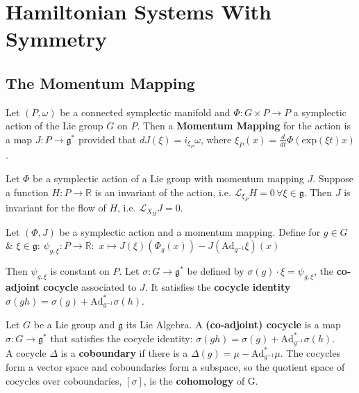 

\section{Hamiltonian Systems With Symmetry}

\subsection{The Momentum Mapping}

\begin{defn}

Let $(P,\omega)$ be a connected symplectic manifold and $\Phi: G \times P \to P$ a symplectic action of the Lie group $G$ on $P$. Then a \textbf{Momentum Mapping} for the action is a map $J:P \to \mathfrak{g}^*$ provided that $dJ (\xi) = i_{\xi_P} \omega$, where $\xi_P (x) = \frac{d}{dt}\Phi(\mathrm{exp}(\xi t) x)$.
\end{defn}

\begin{thm}

Let $\Phi$ be a symplectic action of a Lie group with momentum mapping $J$. Suppose a function $H: P \to \mathbb{R}$ is an invariant of the action, i.e. $\mathcal{L}_{\xi_P} H = 0 \hspace{2pt} \forall \xi \in \mathfrak{g}$. Then $J$ is invariant for the flow of $H$, i.e. $\mathcal{L}_{X_H}J = 0$.
\end{thm}

\begin{prop}

Let $(\Phi, J)$ be a symplectic action and a momentum mapping. Define for $g \in G$ \& $\xi \in \mathfrak{g}$:
$\psi_{g,\xi}:P \to \mathbb{R}: \hspace{4pt} x \mapsto J(\xi)(\Phi_g(x)) - J(\mathrm{Ad}_{g^{-1}}\xi)(x)$

Then $\psi_{g,\xi}$ is constant on $P$. Let $\sigma:G \to \mathfrak{g}^*$ be defined by $\sigma(g) \cdot \xi = \psi_{g,\xi}$, the \textbf{co-adjoint cocycle} associated to $J$. It satisfies the \textbf{cocycle identity} $\sigma(gh) = \sigma(g) + \mathrm{Ad}^*_{g^{-1}}\sigma(h)$.
\end{prop}

\begin{prop}

Let $G$ be a Lie group and $\mathfrak{g}$ its Lie Algebra. A \textbf{(co-adjoint) cocycle} is a map $\sigma: G \to \mathfrak{g}^*$ that satisfies the cocycle identity: $\sigma(gh) = \sigma(g) + \mathrm{Ad}^*_{g^{-1}} \sigma(h)$. \\
\indent A cocycle $\Delta$ is a \textbf{coboundary} if there is a $\Delta(g) = \mu - \mathrm{Ad}^*_{g^{-1}} \mu$. The cocycles form a vector space and coboundaries form a subspace, so the quotient space of cocycles over coboundaries, $[\sigma]$, is the \textbf{cohomology} of G.

\end{prop}

